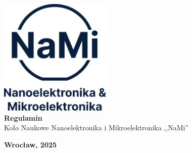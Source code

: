 \documentclass[12pt,a4paper]{article}
\begin{document}
\begin{center}
    \includegraphics[width=0.4\textwidth]{logo.png} \\
    \vspace{5cm}
    {\LARGE \textbf{Regulamin}} \\[0.5cm]
    {\Large {Koło Naukowe Nanoelektronika i Mikroelektronika ,,NaMi''}}
\end{center}

\vfill

\begin{center}
    {\Large \textbf{Wrocław, 2025}}
\end{center}

\thispagestyle{empty}

\newpage
\end{document}
